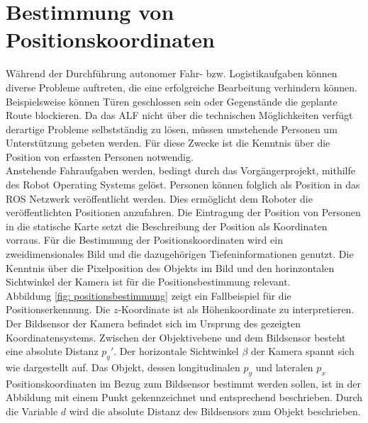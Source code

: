 	\section{Bestimmung von Positionskoordinaten}
	\label{sec: Bestimmung der Positionskoordinaten}
		Während der Durchführung autonomer Fahr- bzw. Logistikaufgaben können diverse Probleme auftreten, die eine erfolgreiche Bearbeitung verhindern können. Beispielsweise können Türen geschlossen sein oder Gegenstände die geplante Route blockieren. Da das ALF nicht über die technischen Möglichkeiten verfügt derartige Probleme selbstständig zu lösen, müssen umstehende Personen um Unterstützung gebeten werden. Für diese Zwecke ist die Kenntnis über die Position von erfassten Personen notwendig.\\
		
	
		Anstehende Fahraufgaben werden, bedingt durch das Vorgängerprojekt, mithilfe des Robot Operating Systems gelöst. Personen können folglich als Position in das ROS Netzwerk veröffentlicht werden. Dies ermöglicht dem Roboter die veröffentlichten Positionen anzufahren. Die Eintragung der Position von Personen in die statische Karte setzt die Beschreibung der Position als Koordinaten vorraus. Für die Bestimmung der Positionskoordinaten wird ein zweidimensionales Bild und die dazugehörigen Tiefeninformationen genutzt. Die Kenntnis über die Pixelposition des Objekts im Bild und den horinzontalen Sichtwinkel der Kamera ist für die Positionsbestimmung relevant.\\
		
		Abbildung \ref{fig: positionsbestimmung} zeigt ein Fallbeispiel für die Positionserkennung. Die $z$-Koordinate ist als Höhenkoordinate zu interpretieren. Der Bildsensor der Kamera befindet sich im Ursprung des gezeigten Koordinatensystems. Zwischen der Objektivebene und dem Bildsensor besteht eine absolute Distanz ${p_y}'$. Der horizontale Sichtwinkel $\beta$ der Kamera spannt sich wie dargestellt auf. Das Objekt, dessen longitudinalen $p_y$ und lateralen $p_x$ Positionskoordinaten im Bezug zum Bildsensor bestimmt werden sollen, ist in der Abbildung mit einem Punkt gekennzeichnet und entsprechend beschrieben. Durch die Variable $d$ wird die absolute Distanz des Bildsensors zum Objekt beschrieben.\\
		
